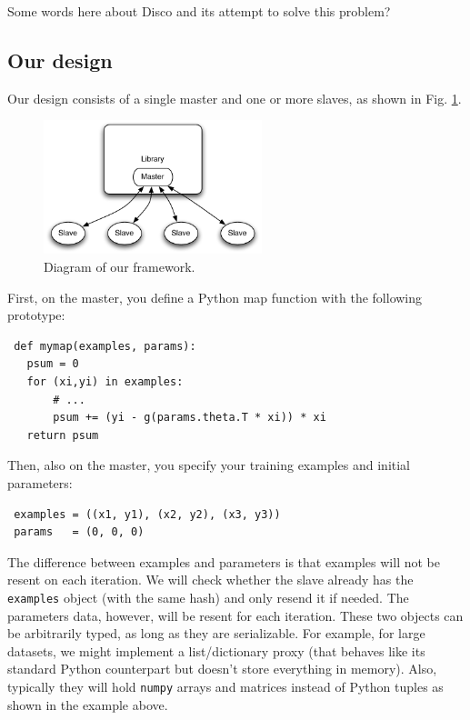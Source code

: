 \documentclass[%
        final,
        notitlepage,
        narroweqnarray,
        inline,
        ]{ieee}
\begin{document}
Some words here about Disco and its attempt to solve this problem?

\subsection{Our design}

Our design consists of a single master and one or more slaves, as shown in
Fig. \ref{diagram}.

\begin{figure}[hb]
  \begin{center}
    \includegraphics[width=2.5in]{fwk_diagram/fwk_diagram.pdf}
  \end{center}
  \caption{Diagram of our framework.}
  \label{diagram}
\end{figure}

First, on the master, you define a Python map function with the following prototype:
\begin{verbatim}
 def mymap(examples, params):
   psum = 0
   for (xi,yi) in examples:
       # ...
       psum += (yi - g(params.theta.T * xi)) * xi
   return psum
\end{verbatim}

Then, also on the master, you specify your training examples and initial parameters:
\begin{verbatim}
 examples = ((x1, y1), (x2, y2), (x3, y3))
 params   = (0, 0, 0)
\end{verbatim}

The difference between examples and parameters is that examples will not be
resent on each iteration. We will check whether the slave already has the {\tt
  examples} object (with the same hash) and only resend it if needed. The
parameters data, however, will be resent for each iteration. These two objects
can be arbitrarily typed, as long as they are serializable. For example, for
large datasets, we might implement a list/dictionary proxy (that behaves like
its standard Python counterpart but doesn't store everything in memory). Also,
typically they will hold {\tt numpy} arrays and matrices instead of Python
tuples as shown in the example above.
\end{document}
